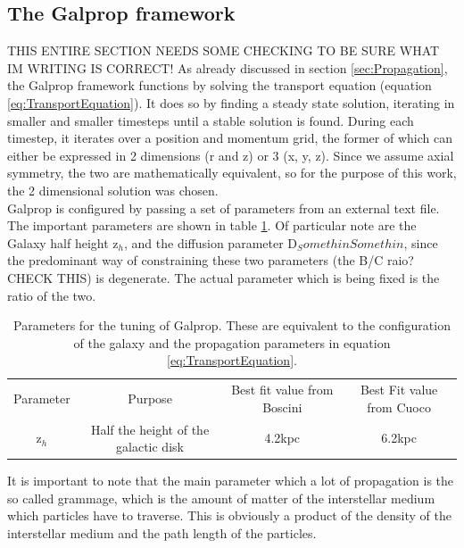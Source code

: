 \subsection{The Galprop framework}\label{sec:GALPROP}
THIS ENTIRE SECTION NEEDS SOME CHECKING TO BE SURE WHAT IM WRITING IS CORRECT!
As already discussed in section \ref{sec:Propagation}, the Galprop framework functions by solving the transport equation (equation \ref{eq:TransportEquation}). It does so by finding a steady state solution, iterating in smaller and smaller timesteps until a stable solution is found. During each timestep, it iterates over a position and momentum grid, the former of which can either be expressed in 2 dimensions (r and z) or 3 (x, y, z). Since we assume axial symmetry, the two are mathematically equivalent, so for the purpose of this work, the 2 dimensional solution was chosen. \\

Galprop is configured by passing a set of parameters from an external text file. The important parameters are shown in table \ref{tab:GalpropParameters}. Of particular note are the Galaxy half height z$_h$, and the diffusion parameter D$_SomethinSomethin$, since the predominant way of constraining these two parameters (the B/C raio? CHECK THIS) is degenerate. The actual parameter which is being fixed is the ratio of the two. \\


\begin{table}[h]
    \centering
    \begin{tabular}{|c|c|c|c|}
        \hline
        Parameter & Purpose & Best fit value from Boscini & Best Fit value from Cuoco \\
        z$_h$ & Half the height of the galactic disk & 4.2kpc & 6.2kpc \\
        \hline
    \end{tabular}
    \caption{Parameters for the tuning of Galprop. These are equivalent to the configuration of the galaxy and the propagation parameters in equation \ref{eq:TransportEquation}.}
    \label{tab:GalpropParameters}
\end{table}

It is important to note that the main parameter which a lot of propagation is the so called grammage, which is the amount of matter of the interstellar medium which particles have to traverse. This is obviously a product of the density of the interstellar medium and the path length of the particles. \\

